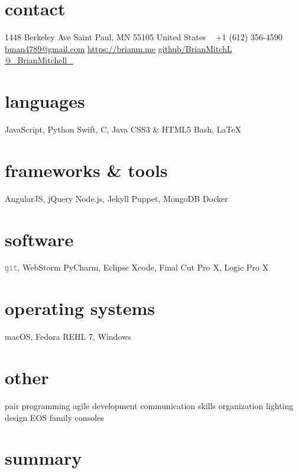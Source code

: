 \documentclass[]{cv-style} %
\begin{document}
\lastupdated


\begin{aside} %
\section{contact}
1448 Berkeley Ave
Saint Paul, MN 55105
United States
~
+1 (612) 356-4590
~
\href{mailto:bman4789@gmail.com}{bman4789@gmail.com}
\href{https://brianm.me}{https://brianm.me}
\href{https://github.com/BrianMitchL}{\textcolor{darkgray}{ }github/BrianMitchL}
\href{https://twitter.com/_BrianMitchell_}{\textcolor{twitter}{ }@\_BrianMitchell\_}
\section{languages}
JavaScript, Python
Swift, C, Java
CSS3 \& HTML5
Bash, \LaTeX
\section{frameworks \& tools}
AngularJS, jQuery
Node.js, Jekyll
Puppet, MongoDB
Docker
\section{software}
\textcolor{gray}{\texttt{git}}, WebStorm
PyCharm, Eclipse
Xcode, Final Cut Pro X,
Logic Pro X
\section{operating systems}
macOS, Fedora
REHL 7, Windows
\section{other}
pair programming
agile development
communication skills
organization
lighting design
EOS family consoles
\end{aside}

\vspace{0.2cm}
\section{summary}
\end{document}
